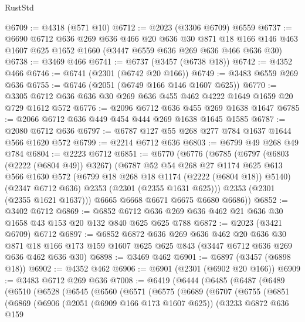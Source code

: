 \begin{lexlean}{RustStd}
\begin{coremodule}
@6709 := @4318 (@571 @10)
@6712 := @2023 (@3306 @6709) @6559
@6737 := @6690
    @6712
    @636
    @269
    @636
    @466
    @20
    @636
    @30
    @871
    @18
    @166
    @146
    @463
    @1607
    @625
    @1652
    @1660
    (@3447 @6559 @636 @269 @636 @466 @636 @30)
@6738 := @3469 @466
@6741 := @6737 (@3457 (@6738 @18))
@6742 := @4352 @466
@6746 := @6741 (@2301 (@6742 @20 @166))
@6749 := @3483 @6559 @269 @636
@6755 := @6746 (@2051 (@6749 @166 @146 @1607 @625))
@6770 := @3305 @6712 @636 @636 @30 @269 @636 @455 @462 @4222 @1649 @1659 @20 @729 @1612 @572
@6776 := @2096 @6712 @636 @455 @269 @1638 @1647
@6785 := @2066 @6712 @636 @449 @454 @444 @269 @1638 @1645 @1585
@6787 := @2080 @6712 @636
@6797 := @6787 @127 @55 @268 @277 @784 @1637 @1644 @566 @1620 @572
@6799 := @2214 @6712 @636
@6803 := @6799 @49 @268 @49 @784
@6804 := @2223 @6712
@6851 := @6770
    (@6776
      (@6785
        (@6797
          (@6803 (@2222 (@6804 @49)) @3267)
          (@6787
            @52
            @54
            @268
            @27
            @1174
            @625
            @613
            @566
            @1630
            @572
            (@6799 @18 @268 @18 @1174 (@2222 (@6804 @18)) @5140)
            (@2347 @6712 @636)
            @2353
            (@2301 (@2355 @1631 @625)))
          @2353
          (@2301 (@2355 @1621 @1637)))
        @6665
        @6668
        @6671
        @6675
        @6680
        @6686))
@6852 := @3402 @6712
@6869 := @6852 @6712 @636 @269 @636 @462 @21 @636 @30 @1658 @43 @153 @20 @132 @840 @625 @625 @788
@6872 := @2023 (@3421 @6709) @6712
@6897 := @6852
    @6872
    @636
    @269
    @636
    @462
    @20
    @636
    @30
    @871
    @18
    @166
    @173
    @159
    @1607
    @625
    @625
    @843
    (@3447 @6712 @636 @269 @636 @462 @636 @30)
@6898 := @3469 @462
@6901 := @6897 (@3457 (@6898 @18))
@6902 := @4352 @462
@6906 := @6901 (@2301 (@6902 @20 @166))
@6909 := @3483 @6712 @269 @636
@7008 := @6419
    (@6444
      (@6485
        (@6487
          (@6489
            (@6510
              (@6528
                (@6545
                  (@6560
                    (@6571
                      (@6575
                        (@6689
                          (@6707
                            (@6755
                              (@6851
                                (@6869
                                  (@6906
                                    (@2051 (@6909 @166 @173 @1607 @625))
                                    (@3233
                                      @6872
                                      @636
                                      @159

\end{coremodule}
\end{lexlean}

